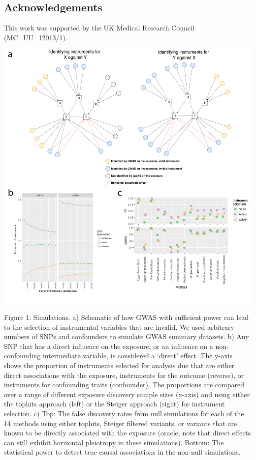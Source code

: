 \documentclass[]{article}
\begin{document}
\subsection{Acknowledgements}\label{acknowledgements}

This work was supported by the UK Medical Research Council
(MC\_UU\_12013/1).

\newpage

\includegraphics{images/fig1.pdf}

Figure 1: Simulations. a) Schematic of how GWAS with sufficient power
can lead to the selection of instrumental variables that are invalid. We
used arbitrary numbers of SNPs and confounders to simulate GWAS summary
datasets. b) Any SNP that has a direct influence on the exposure, or an
influence on a non-confounding intermediate variable, is considered a
`direct' effect. The y-axis shows the proportion of instruments selected
for analysis due that are either direct associations with the exposure,
instruments for the outcome (reverse), or instruments for confounding
traits (confounder). The proportions are compared over a range of
different exposure discovery sample sizes (x-axis) and using either the
tophits approach (left) or the Steiger approach (right) for instrument
selection. c) Top: The false discovery rates from null simulations for
each of the 14 methods using either tophits, Steiger filtered variants,
or variants that are known to be directly associated with the exposure
(oracle, note that direct effects can still exhibit horizontal
pleiotropy in these simulations). Bottom: The statistical power to
detect true causal associations in the non-null simulations.
\end{document}
